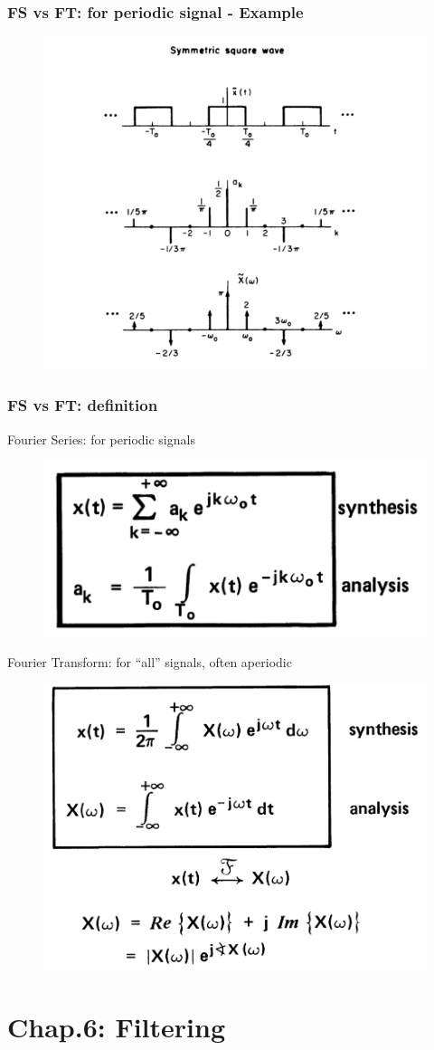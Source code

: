 \documentclass{beamer}
\begin{document}
\begin{frame}
    \frametitle{FS vs FT: for periodic signal - Example}
    \begin{figure}
        \includegraphics[width=0.7\linewidth]{FSvsFT_eg}
    \end{figure}
\end{frame}



\begin{frame}
    \frametitle{FS vs FT: definition}
    Fourier Series: for periodic signals
    \begin{figure}
        \includegraphics[width=0.4\linewidth]{FS_def}
    \end{figure}
    Fourier Transform: for ``all'' signals, often aperiodic
    \begin{figure}
        \includegraphics[width=0.4\linewidth]{FT_def}
    \end{figure}
\end{frame}


\section{Chap.6: Filtering}
\end{document}
